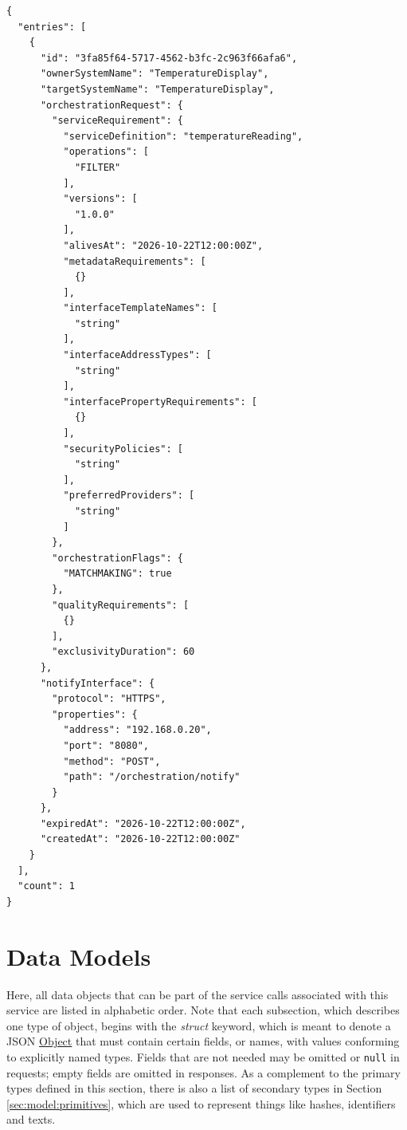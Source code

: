 \documentclass[a4paper]{arrowhead}
\newcommand{\oref}[1]{{\textcolor{ArrowheadBlue}{\hyperref[sec:operations:#1]{#1}}}}
\newcommand{\pref}[1]{{\textcolor{ArrowheadGrey}{\hyperref[sec:model:primitives:#1]{#1}}}}
\begin{document}
\begin{lstlisting}[label={lst:query-resp},caption={An \oref{query} response.}]
{
  "entries": [
    {
      "id": "3fa85f64-5717-4562-b3fc-2c963f66afa6",
      "ownerSystemName": "TemperatureDisplay",
      "targetSystemName": "TemperatureDisplay",
      "orchestrationRequest": {
        "serviceRequirement": {
          "serviceDefinition": "temperatureReading",
          "operations": [
            "FILTER"
          ],
          "versions": [
            "1.0.0"
          ],
          "alivesAt": "2026-10-22T12:00:00Z",
          "metadataRequirements": [
            {}
          ],
          "interfaceTemplateNames": [
            "string"
          ],
          "interfaceAddressTypes": [
            "string"
          ],
          "interfacePropertyRequirements": [
            {}
          ],
          "securityPolicies": [
            "string"
          ],
          "preferredProviders": [
            "string"
          ]
        },
        "orchestrationFlags": {
          "MATCHMAKING": true
        },
        "qualityRequirements": [
          {}
        ],
        "exclusivityDuration": 60
      },
      "notifyInterface": {
        "protocol": "HTTPS",
        "properties": {
          "address": "192.168.0.20",
          "port": "8080",
          "method": "POST",
          "path": "/orchestration/notify"
        }
      },
      "expiredAt": "2026-10-22T12:00:00Z",
      "createdAt": "2026-10-22T12:00:00Z"
    }
  ],
  "count": 1
}
\end{lstlisting}

\newpage

\section{Data Models}
\label{sec:model}

Here, all data objects that can be part of the service calls associated with this service are listed in alphabetic order.
Note that each subsection, which describes one type of object, begins with the \textit{struct} keyword, which is meant to denote a JSON \pref{Object} that must contain certain fields, or names, with values conforming to explicitly named types.
Fields that are not needed may be omitted or \texttt{null} in requests; empty fields are omitted in responses.
As a complement to the primary types defined in this section, there is also a list of secondary types in Section \ref{sec:model:primitives}, which are used to represent things like hashes, identifiers and texts.
\end{document}
